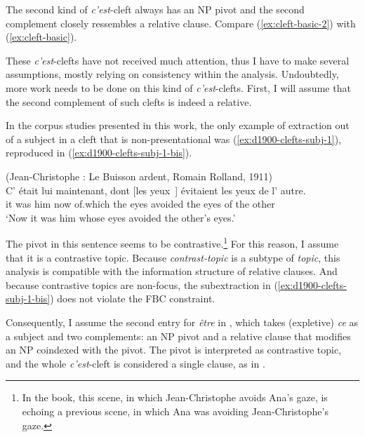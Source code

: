 The second kind of \emph{c'est}-cleft always has an NP pivot and the second complement closely ressembles a relative clause. Compare (\ref{ex:cleft-basic-2}) with (\ref{ex:cleft-basic}).

\label{ex:cleft-basic-2}
\z 

These \emph{c'est}-clefts have not received much attention, thus I have to make several assumptions, mostly relying on consistency within the analysis. Undoubtedly, more work needs to be done on this kind of \emph{c'est}-clefts. First, I will assume that the second complement of such clefts is indeed a relative.

In the corpus studies presented in this work, the only example of extraction out of a subject in a cleft that is non-presentational was (\ref{ex:d1900-clefts-subj-1}), reproduced in (\ref{ex:d1900-clefts-subj-1-bis}).

\ea (Jean-Christophe : Le Buisson ardent, Romain Rolland, 1911)\\
\gll C' était lui maintenant, dont [les yeux~\trace{}] évitaient les yeux de l' autre.\\
it was him now of.which \sbar{}the eyes avoided the eyes of the other\\
\glt `Now it was him whose eyes avoided the other's eyes.'
\label{ex:d1900-clefts-subj-1-bis}
\z 

The pivot in this sentence seems to be contrastive.\footnote{In the book, this scene, in which Jean-Christophe avoids Ana's gaze, is echoing a previous scene, in which Ana was avoiding Jean-Christophe's gaze.} For this reason, I assume that it is a contrastive topic. Because \emph{contrast-topic} is a subtype of \emph{topic}, this analysis is compatible with the information structure of relative clauses. And because contrastive topics are non-focus, the subextraction in (\ref{ex:d1900-clefts-subj-1-bis}) does not violate the FBC constraint. 

Consequently, I assume the second entry for \emph{être} in , which takes (expletive) \emph{ce} as a subject and two complements: an NP pivot and a relative clause that modifies an NP coindexed with the pivot.
The pivot is interpreted as contrastive topic, and the whole \emph{c'est}-cleft is considered a single clause, as in .

